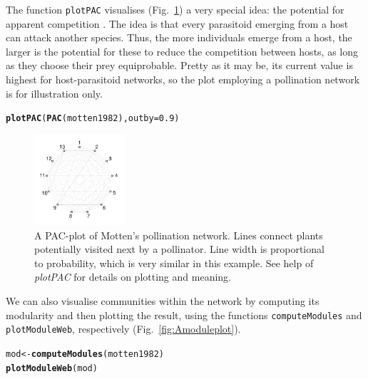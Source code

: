 \documentclass[a4paper, 11pt]{article}\usepackage[]{graphicx}\usepackage[]{color}
\makeatletter
\newcommand{\hlnum}[1]{\textcolor[rgb]{0.686,0.059,0.569}{#1}}%
\newcommand{\hlstd}[1]{\textcolor[rgb]{0.345,0.345,0.345}{#1}}%
\newcommand{\hlkwb}[1]{\textcolor[rgb]{0.69,0.353,0.396}{#1}}%
\newcommand{\hlkwc}[1]{\textcolor[rgb]{0.333,0.667,0.333}{#1}}%
\newcommand{\hlkwd}[1]{\textcolor[rgb]{0.737,0.353,0.396}{\textbf{#1}}}%
\newenvironment{kframe}{%
 \def\at@end@of@kframe{}%
 \ifinner\ifhmode%
  \def\at@end@of@kframe{\end{minipage}}%
  \begin{minipage}{\columnwidth}%
 \fi\fi%
 \def\FrameCommand##1{\hskip\@totalleftmargin \hskip-\fboxsep
 \colorbox{shadecolor}{##1}\hskip-\fboxsep
     \hskip-\linewidth \hskip-\@totalleftmargin \hskip\columnwidth}%
 \MakeFramed {\advance\hsize-\width
   \@totalleftmargin\z@ \linewidth\hsize
   \@setminipage}}%
 {\par\unskip\endMakeFramed%
 \at@end@of@kframe}
\newenvironment{knitrout}{}{} %
\newcommand{\indR}[1]{\texttt{#1}\index{#1@\texttt{#1}}}   %
\makeatother
\begin{document}
The function \indR{plotPAC} visualises  (Fig.~\ref{fig:AplotPAC}) a very special idea: the potential for apparent competition \citep{Morris2005}. The idea is that every parasitoid emerging from a host can attack another species. Thus, the more individuals emerge from a host, the larger is the potential for these to reduce the competition between hosts, as long as they choose their prey equiprobable. Pretty as it may be, its current value is highest for host-parasitoid networks, so the plot employing a pollination network is for illustration only.
\begin{knitrout}
\color{fgcolor}\begin{kframe}
\begin{alltt}
\hlkwd{plotPAC}\hlstd{(}\hlkwd{PAC}\hlstd{(motten1982),} \hlkwc{outby}\hlstd{=}\hlnum{0.9}\hlstd{)}
\end{alltt}
\end{kframe}
\end{knitrout}
%
\begin{figure}
  \centering
	\includegraphics[width=0.3\textwidth]{figures/motten1982_PACplot}
	\caption{A PAC-plot of Motten's \citeyear{Motten1982} pollination network. Lines connect plants potentially visited next by a pollinator. Line width is proportional to probability, which is very similar in this example. See help of \emph{plotPAC} for details on plotting and meaning.}
	\label{fig:AplotPAC}
\end{figure}
%
We can also visualise communities within the network by computing its modularity and then plotting the result, using the functions \texttt{computeModules} and \texttt{plotModuleWeb}, respectively (Fig.~\ref{fig:Amoduleplot}).
\begin{knitrout}
\color{fgcolor}\begin{kframe}
\begin{alltt}
\hlstd{mod} \hlkwb{<-} \hlkwd{computeModules}\hlstd{(motten1982)}
\hlkwd{plotModuleWeb}\hlstd{(mod)}
\end{alltt}
\end{kframe}
\end{knitrout}
\end{document}
